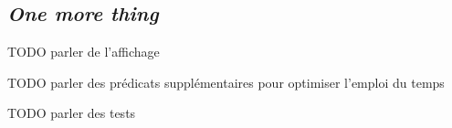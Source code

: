 
\subsection{\textit{One more thing}}

TODO parler de l'affichage

TODO parler des prédicats supplémentaires pour optimiser l'emploi du temps

TODO parler des tests
